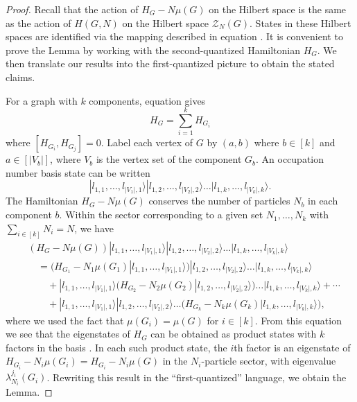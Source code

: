 \documentclass[../thesis-main/thesis-main]{subfiles}
\begin{document}
\begin{proof}
Recall that the action of $H_{G}-N\mu(G)$ on the Hilbert space  is the same as the action of $H(G,N)$ on the Hilbert space $\mathcal{Z}_{N}(G)$. States in these Hilbert spaces are identified via the mapping described in equation . It is convenient to prove the Lemma by working with the second-quantized Hamiltonian $H_{G}$. We then translate our results into the first-quantized picture to obtain the stated claims.

For a graph with $k$ components, equation  gives 
\begin{equation}
H_{G}=\sum_{i=1}^{k}H_{G_{i}}\label{eq:H_G_disconnected}
\end{equation}
where $[H_{G_{i}},H_{G_{j}}]=0.$ Label each vertex of $G$ by $(a,b)$ where $b\in[k]$ and $a\in[|V_{b}|]$, where $V_{b}$ is the vertex set of the component $G_{b}$. An occupation number basis state  can be written 
\begin{equation}
|l_{1,1},\ldots,l_{|V_{1}|,1}\rangle|l_{1,2},\ldots,l_{|V_{2}|,2}\rangle\ldots|l_{1,k},\ldots,l_{|V_{k}|,k}\rangle.\label{eq:prod_basis_occ_num}
\end{equation}
The Hamiltonian $H_{G}-N\mu(G)$ conserves the number of particles $N_{b}$ in each component $b$. Within the sector corresponding to a given set $N_{1},\ldots,N_{k}$ with $\sum_{i \in [k]} N_i=N$, we have
\begin{align*}
& \left(H_{G}-N\mu(G)\right)|l_{1,1},\ldots,l_{|V_{1}|,1}\rangle|l_{1,2},\ldots,l_{|V_{2}|,2}\rangle\ldots|l_{1,k},\ldots,l_{|V_{k}|,k}\rangle\\
&\quad =\big(H_{G_1}-N_1\mu(G_1)|l_{1,1},\ldots,l_{|V_{1}|,1}\rangle\big)|l_{1,2},\ldots,l_{|V_{2}|,2}\rangle\ldots|l_{1,k},\ldots,l_{|V_{k}|,k}\rangle\\
&\qquad+|l_{1,1},\ldots,l_{|V_{1}|,1}\rangle\big(H_{G_2}-N_2\mu(G_2)|l_{1,2},\ldots,l_{|V_{2}|,2}\rangle\big)\ldots|l_{1,k},\ldots,l_{|V_{k}|,k}\rangle + \cdots\\
&\qquad+|l_{1,1},\ldots,l_{|V_{1}|,1}\rangle|l_{1,2},\ldots,l_{|V_{2}|,2}\rangle\ldots\big(H_{G_k}-N_k\mu(G_k)|l_{1,k},\ldots,l_{|V_{k}|,k}\rangle\big),
\end{align*}
where we used the fact that $\mu(G_i)=\mu(G)$ for $i\in[k]$.  From this equation we see that the eigenstates of $H_{G}$ can be obtained as product states with $k$ factors in the basis . In each such product state, the $i$th factor is an eigenstate of $H_{G_{i}}-N_{i}\mu(G_{i})=H_{G_{i}}-N_{i}\mu(G)$ in the $N_{i}$-particle sector, with eigenvalue $\lambda_{N_{i}}^{j_{i}}(G_{i})$. Rewriting this result in the ``first-quantized'' language, we obtain the Lemma. 
\end{proof}
\end{document}
